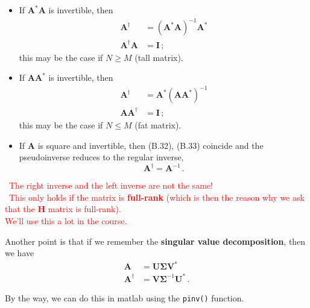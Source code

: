 \documentclass[a4paper, 12pt]{book}
\begin{document}
\begin{itemize}
    \item If $\boldsymbol{A}^*\boldsymbol{A}$ is invertible, then
    \begin{align}
        \boldsymbol{A}^{\dagger} &= (\boldsymbol{A}^*\boldsymbol{A})^{-1}\boldsymbol{A}^* \tag{B.32} \\
        \boldsymbol{A}^{\dagger}\boldsymbol{A} &= \boldsymbol{I} \,;
    \end{align}
    this may be the case if $N \geq M$ (tall matrix).

    \item If $\boldsymbol{A}\boldsymbol{A}^*$ is invertible, then
    \begin{align}
        \boldsymbol{A}^{\dagger} &= \boldsymbol{A}^*(\boldsymbol{A}\boldsymbol{A}^*)^{-1} \tag{B.33} \\
        \boldsymbol{A}\boldsymbol{A}^{\dagger} &= \boldsymbol{I} \,;
    \end{align}
    this may be the case if $N \leq M$ (fat matrix).

    \item If $\boldsymbol{A}$ is square and invertible, then (B.32), (B.33) coincide and the pseudoinverse reduces to the regular inverse,
    \[ \boldsymbol{A}^{\dagger} = \boldsymbol{A}^{-1} \,. \]
\end{itemize}

\textcolor{red}{\faExclamationTriangle\ The right inverse and the left inverse are not the same!}\\
\textcolor{red}{\faExclamationTriangle\ This only holds if the matrix is \textbf{full-rank} (which is then the reason why we ask that the $\boldsymbol{H}$ matrix is full-rank).}\\
\textcolor{red}{We'll use this a lot in the course.}

Another point is that if we remember the \textbf{singular value decomposition}, then we have
\begin{align*}
    \boldsymbol{A} &= \mathbf{U}\boldsymbol{\Sigma}\mathbf{V}^* \\
    \boldsymbol{A}^{\dagger} &= \mathbf{V}\boldsymbol{\Sigma}^{-1}\mathbf{U}^* \,.
\end{align*}

\begin{tcolorbox}[colback=obsidianGreen, colframe=white, boxrule=0pt, sharp corners]
    By the way, we can do this in matlab using the \texttt{pinv()} function.
\end{tcolorbox}
\end{document}
